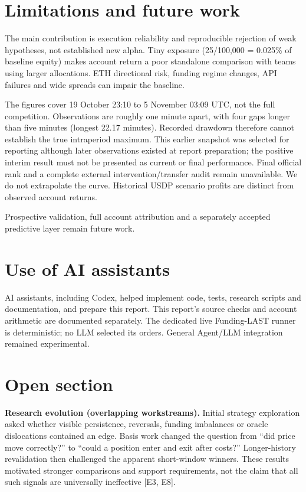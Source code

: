 \documentclass[a4paper]{article}
\begin{document}
\section{Limitations and future work}
The main contribution is execution reliability and reproducible rejection of weak hypotheses, not established new alpha. Tiny exposure (25/100,000 = 0.025\% of baseline equity) makes account return a poor standalone comparison with teams using larger allocations. ETH directional risk, funding regime changes, API failures and wide spreads can impair the baseline.

The figures cover 19 October 23:10 to 5 November 03:09 UTC, not the full competition. Observations are roughly one minute apart, with four gaps longer than five minutes (longest 22.17 minutes). Recorded drawdown therefore cannot establish the true intraperiod maximum. This earlier snapshot was selected for reporting although later observations existed at report preparation; the positive interim result must not be presented as current or final performance. Final official rank and a complete external intervention/transfer audit remain unavailable. We do not extrapolate the curve. Historical USDP scenario profits are distinct from observed account returns.

Prospective validation, full account attribution and a separately accepted predictive layer remain future work.

\section{Use of AI assistants}
AI assistants, including Codex, helped implement code, tests, research scripts and documentation, and prepare this report. This report's source checks and account arithmetic are documented separately. The dedicated live Funding-LAST runner is deterministic; no LLM selected its orders. General Agent/LLM integration remained experimental.

\section{Open section}
\textbf{Research evolution (overlapping workstreams).} Initial strategy exploration asked whether visible persistence, reversals, funding imbalances or oracle dislocations contained an edge. Basis work changed the question from ``did price move correctly?'' to ``could a position enter and exit after costs?'' Longer-history revalidation then challenged the apparent short-window winners. These results motivated stronger comparisons and support requirements, not the claim that all such signals are universally ineffective [E3, E8].
\end{document}
